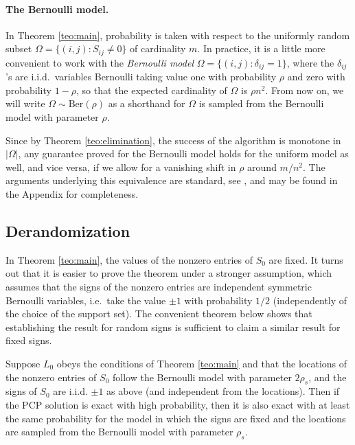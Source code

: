 \paragraph{The Bernoulli model.} In Theorem \ref{teo:main},
probability is taken with respect to the uniformly random subset
$\Omega = \{(i,j) : S_{ij} \neq 0\}$ of cardinality $m$. In practice, it is a little more convenient to work with the {\em Bernoulli model}
$\Omega = \{(i,j) : \delta_{ij} = 1\}$, where the $\delta_{ij}$'s are i.i.d.~variables Bernoulli taking value one with probability $\rho$
and zero with probability $1-\rho$, so that the expected cardinality of $\Omega$ is $\rho n^2$. From now on, we will write $\Omega \sim
\text{Ber}(\rho)$ as a shorthand for $\Omega$ is sampled from the Bernoulli model with parameter $\rho$.

Since by Theorem \ref{teo:elimination}, the success of the algorithm is monotone in $|\Omega|$, any guarantee proved for the Bernoulli model holds for the uniform model as well, and vice versa, if we allow for a vanishing shift in $\rho$ around $m/n^2$. The arguments underlying this equivalence are standard, see \cite{CRT,CT09}, and may be found in the Appendix for completeness.

\subsection{Derandomization}
\label{sec:derandom}

In Theorem \ref{teo:main}, the values of the nonzero entries of $S_0$ are fixed. It turns out that it is easier to prove the theorem under a stronger assumption, which assumes that the signs of the nonzero entries are independent symmetric Bernoulli variables, i.e.~take the value $\pm 1$ with probability $1/2$ (independently of the choice of the support set). The convenient theorem below shows that establishing the result for random signs is sufficient to claim a similar result for fixed signs.

\begin{theorem}
  \label{teo:derandom}
  Suppose $L_0$ obeys the conditions of Theorem \ref{teo:main} and that the locations of the nonzero entries of $S_0$ follow the Bernoulli model with parameter $2\rho_s$, and the signs of $S_0$ are i.i.d. $\pm 1$ as above (and independent from the locations). Then if the PCP solution is exact with high probability, then it is also exact with at least the same probability for the model in which the signs are fixed and the locations are sampled from the Bernoulli model with parameter $\rho_s$.
\end{theorem}

